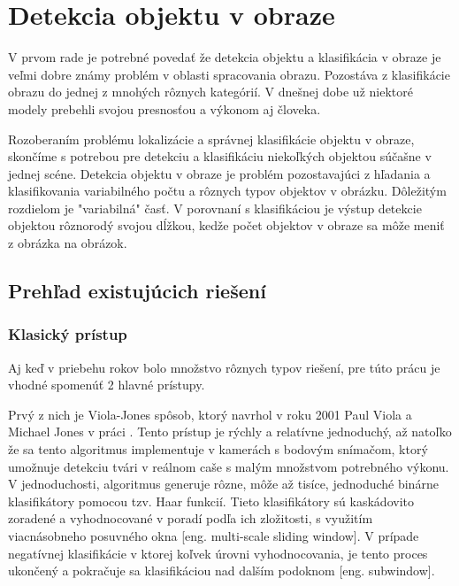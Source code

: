 
\section{Detekcia objektu v obraze}
\label{sec:detekcia}

V prvom rade je potrebné povedať že detekcia objektu a klasifikácia v obraze je veľmi dobre známy problém v oblasti spracovania obrazu.
Pozostáva z klasifikácie obrazu do jednej z mnohých rôznych kategórií.
V dnešnej dobe už niektoré modely prebehli svojou presnosťou a výkonom aj človeka\cite{prop:NNvsHuman}.

Rozoberaním problému lokalizácie a správnej klasifikácie objektu v obraze, skončíme s potrebou
    pre detekciu a klasifikáciu niekoľkých objektou súčašne v jednej scéne.
Detekcia objektu v obraze je problém pozostavajúci z hľadania a klasifikovania variabilného počtu a rôznych typov objektov v obrázku.
Dôležitým rozdielom je "variabilná" časť. V porovnaní s klasifikáciou je výstup detekcie objektou rôznorodý svojou dĺžkou, kedže
    počet objektov v obraze sa môže meniť z obrázka na obrázok\cite{odkaz:ObjectDetectionOverview}.

\subsection{Prehľad existujúcich riešení}

\subsubsection{Klasický prístup}
Aj keď v priebehu rokov bolo množstvo rôznych typov riešení, pre túto prácu je vhodné spomenúť 2 hlavné prístupy.

Prvý z nich je Viola-Jones spôsob, ktorý navrhol v roku 2001 Paul Viola a Michael Jones v práci \cite{prop:Viola2001RobustRF}.
Tento prístup je rýchly a relatívne jednoduchý, až natoľko že sa tento algoritmus implementuje v kamerách s bodovým snímačom, ktorý umožnuje
    detekciu tvári v reálnom caše s malým množstvom potrebného výkonu.
V jednoduchosti, algoritmus generuje rôzne, môže až tisíce, jednoduché binárne klasifikátory pomocou tzv. Haar funkcií.
Tieto klasifikátory sú kaskádovito zoradené a vyhodnocované v poradí podľa ich zložitosti, s využitím viacnásobneho posuvného okna [eng. multi-scale sliding window].
V prípade negatívnej klasifikácie v ktorej koľvek úrovni vyhodnocovania, je tento proces ukončený a pokračuje sa klasifikáciou nad dalším podoknom [eng. subwindow]\cite{prop:Viola2001RobustRF}.

